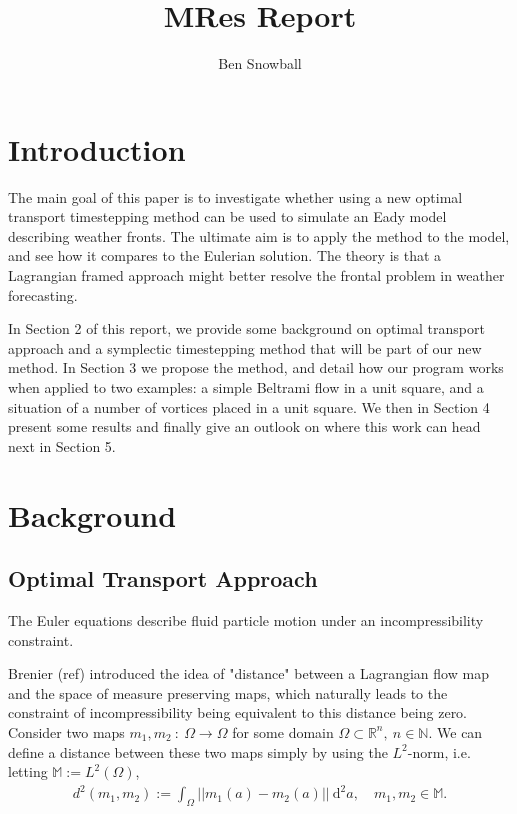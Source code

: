\documentclass[11pt, oneside]{article}   	%
\title{MRes Report}
\author{Ben Snowball}
\newcommand{\R}{\mathbb{R}}
\newcommand{\M}{\mathbb{M}}
\newcommand{\N}{\mathbb{N}}
\begin{document}
\maketitle
\section{Introduction}

The main goal of this paper is to investigate whether using a new optimal transport timestepping method can be used to simulate an Eady model describing weather fronts. The ultimate aim is to apply the method to the model, and see how it compares to the Eulerian solution. The theory is that a Lagrangian framed approach might better resolve the frontal problem in weather forecasting.

In Section 2 of this report, we provide some background on optimal transport approach and a symplectic timestepping method that will be part of our new method. In Section 3 we propose the method, and detail how our program works when applied to two examples: a simple Beltrami flow in a unit square, and a situation of a number of vortices placed in a unit square. We then in Section 4 present some results and finally give an outlook on where this work can head next in Section 5.


\section{Background}

\subsection{Optimal Transport Approach}

The Euler equations describe fluid particle motion under an incompressibility constraint. 

Brenier (ref) introduced the idea of "distance" between a Lagrangian flow map and the space of measure preserving maps, which naturally leads to the constraint of incompressibility being equivalent to this distance being zero. Consider two maps \(m_1, m_2 \: : \: \Omega \to \Omega\) for some domain \(\Omega \subset \R^n, \: n \in \N\). We can define a distance between these two maps simply by using the \(L^2\)-norm, i.e. letting \(\M := L^2(\Omega)\), 
\begin{align}
d^2(m_1, m_2) := \int_\Omega || m_1(a) - m_2(a) || \: \mathrm{d}^2 a, \quad m_1, m_2 \in \M.
\end{align}
\end{document}

